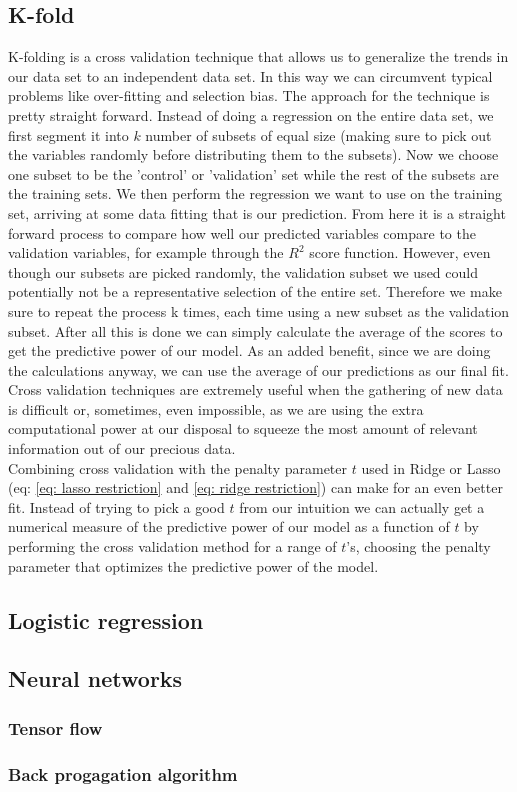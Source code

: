 \subsection{K-fold}
K-folding is a cross validation technique that allows us to generalize the trends in our data set to an independent data set. In this way we can circumvent typical problems like over-fitting and selection bias.\cite{cross-valid} The approach for the technique is pretty straight forward. Instead of doing a regression on the entire data set, we first segment it into $k$ number of subsets of equal size (making sure to pick out the variables randomly before distributing them to the subsets). Now we choose one subset to be the 'control' or 'validation' set while the rest of the subsets are the training sets. We then perform the regression we want to use on the training set, arriving at some data fitting that is our prediction. From here it is a straight forward process to compare how well our predicted variables compare to the validation variables, for example through the $R^2$ score function. However, even though our subsets are picked randomly, the validation subset we used could potentially not be a representative selection of the entire set. Therefore we make sure to repeat the process k times, each time using a new subset as the validation subset. After all this is done we can simply calculate the average of the scores to get the predictive power of our model. As an added benefit, since we are doing the calculations anyway, we can use the average of our predictions as our final fit. Cross validation techniques are extremely useful when the gathering of new data is difficult or, sometimes, even impossible, as we are using the extra computational power at our disposal to squeeze the most amount of relevant information out of our precious data.\\
Combining cross validation with the penalty parameter $t$ used in Ridge or Lasso (eq: \ref{eq: lasso restriction} and \ref{eq: ridge restriction}) can make for an even better fit.
Instead of trying to pick a good $t$ from our intuition we can actually get a numerical measure of the predictive power of our model as a function of $t$ by performing the cross validation method for a range of $t$'s, choosing the penalty parameter that optimizes the predictive power of the model.\cite{morten-reg}


\subsection{Logistic regression}

\subsection{Neural networks}

\subsubsection{Tensor flow}

\subsubsection{Back progagation algorithm}


